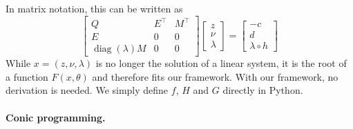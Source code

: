 \documentclass{article}
\DeclareMathOperator*{\diag}{diag}
\begin{document}
In matrix notation, this can be written as
\begin{equation}
\begin{bmatrix}
    Q & E^\top & M^\top \\
    E & 0 & 0 \\
    \diag(\lambda)M & 0 & 0
\end{bmatrix}
\begin{bmatrix} 
z \\ 
\nu \\
\lambda
\end{bmatrix}
=
\begin{bmatrix} 
-c \\ 
d \\
\lambda \circ h
\end{bmatrix}
\label{eq:ineq_const_qp}
\end{equation}
While $x = (z, \nu, \lambda)$ is no longer the solution of a linear system, it
is the root of a function $F(x, \theta)$ and therefore fits our framework.
With our framework, no derivation is needed. We simply define
$f$, $H$ and $G$ directly in Python.

\paragraph{Conic programming.}
\end{document}
